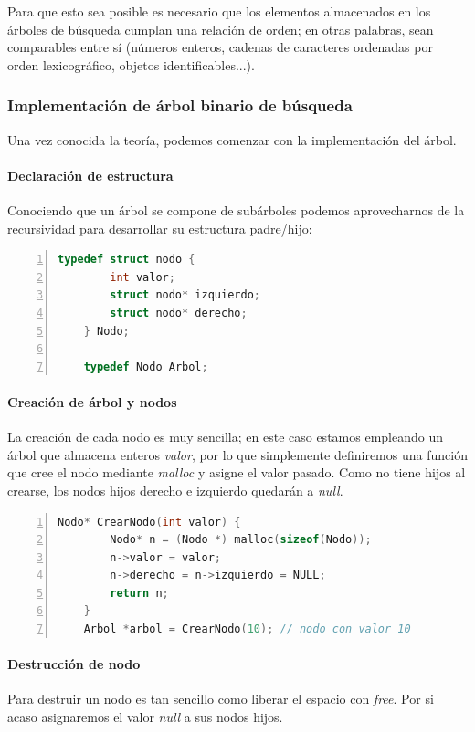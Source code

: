 \documentclass[a4paper, 11pt, titlepage]{article}
\begin{document}
        Para que esto sea posible es necesario que los elementos almacenados en los árboles 
        de búsqueda cumplan una relación de orden; en otras palabras, sean comparables entre 
        sí (números enteros, cadenas de caracteres ordenadas por orden lexicográfico, objetos 
        identificables...).
    
        \subsubsection{Implementación de árbol binario de búsqueda}

            Una vez conocida la teoría, podemos comenzar con la implementación del árbol. 
            
            \paragraph{Declaración de estructura} Conociendo que un árbol se compone de subárboles podemos aprovecharnos de la 
            recursividad para desarrollar su estructura padre/hijo:

            \begin{lstlisting}[language=C,numbers=left]
    typedef struct nodo {
        int valor;
        struct nodo* izquierdo;
        struct nodo* derecho;
    } Nodo;
    
    typedef Nodo Arbol;\end{lstlisting}

            \paragraph{Creación de árbol y nodos} La creación de cada nodo es muy sencilla; en este caso estamos empleando un 
            árbol que almacena enteros \textit{valor}, por lo que simplemente definiremos 
            una función que cree el nodo mediante \textit{malloc} y asigne el valor 
            pasado. Como no tiene hijos al crearse, los nodos hijos derecho e izquierdo 
            quedarán a \textit{null}.

            \begin{lstlisting}[language=C,numbers=left]
    Nodo* CrearNodo(int valor) {
        Nodo* n = (Nodo *) malloc(sizeof(Nodo));
        n->valor = valor;
        n->derecho = n->izquierdo = NULL;
        return n;
    }
    Arbol *arbol = CrearNodo(10); // nodo con valor 10\end{lstlisting}

            \paragraph{Destrucción de nodo} Para destruir un nodo es tan sencillo como liberar el espacio con \textit{free}.
            Por si acaso asignaremos el valor \textit{null} a sus nodos hijos.
\end{document}
